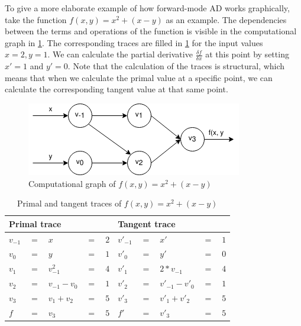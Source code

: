 To give a more elaborate example of how forward-mode AD works graphically, take the function $f(x, y) = x^2 + (x - y)$ as an example.
The dependencies between the terms and operations of the function is visible in the computational graph in \cref{fig:func_trace}.
The corresponding traces are filled in \cref{table:func_trace} for the input values $x = 2, y = 1$.
We can calculate the partial derivative $\frac{\delta f}{\delta x}$ at this point by setting $x' = 1$ and $y' = 0$.
Note that the calculation of the traces is structural, which means that when we calculate the primal value at a specific point, we can calculate the corresponding tangent value at that same point.

\begin{figure}
  \centering
  \includegraphics[scale=0.6]{./assets/function_trace.png}
  \caption{Computational graph of $f(x, y) = x^2 + (x - y)$}
  \label{fig:func_trace}
\end{figure}

\begin{table}
  \begin{center}
    \begin{tabular}{ l l l l l | l l l l l }
      \hline
      \multicolumn{5}{l}{Primal trace} & \multicolumn{5}{l}{Tangent trace} \\
      \hline
$v_{-1} $&$=$&$x$&$=$&$2$             &$v'_{-1}$&$=$&$x'$&$=$&$1$ \\
$v_0    $&$=$&$y$&$=$&$1$             &$v'_{0}$&$=$&$y'$&$=$&$0$ \\
      \hline
$v_1    $&$=$&$v_{-1}^2$&$=$&$4$      &$v'_{1}$&$=$&$2*v_{-1}$&$=$&$4$ \\
$v_2    $&$=$&$v_{-1} - v_{0}$&$=$&$1$&$v'_{2}$&$=$&$v'_{-1}-v'_{0}$&$=$&$1$ \\
$v_3    $&$=$&$v_1 + v_2$&$=$&$5$     &$v'_{3}$&$=$&$v'_1 + v'_2$&$=$&$5$ \\
      \hline
$f      $&$=$&$v_3$&$=$&$5$           &$f'$&$=$&$v'_3$&$=$&$5$ \\
      \hline
    \end{tabular}
  \end{center}
  \caption{Primal and tangent traces of $f(x, y) = x^2 + (x - y)$}
  \label{table:func_trace}
\end{table}

